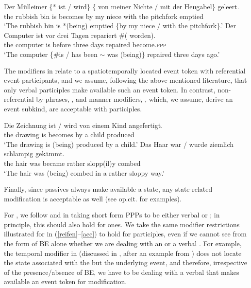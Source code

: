 \documentclass[output=paper,modfonts,newtxmath,hidelinks
\ChapterDOI{10.5281/zenodo.2545513}
]{langscibook}
\begin{document}
\ea\label{reifen}
\ea\gll	Der M\"{u}lleimer \{*\hspace{-2pt} ist / wird\} \{\hspace{-2pt} von meiner Nichte / mit der Heugabel\} geleert.\\
	the {rubbish bin} {} is {} becomes {} by my niece {} with the pitchfork emptied\\
\glt	`The rubbish bin is *(being) emptied \{by my niece / with the pitchfork\}.'
\ex\gll	Der Computer ist vor drei Tagen repariert \#(\hspace{-2pt} worden).\\
	the computer is before three days repaired {} become.\textsc{ppp} \\
\glt	`The computer \{\#is / has been $\sim$ was (being)\} repaired three days ago.'
\z\z

\noindent The modifiers in  relate to a spatiotemporally located event token with referential event participants, and we assume, following the above-mentioned literature, that only verbal participles make available such an event token. In contrast, non-referential by-phrases, , and manner modifiers, , which, we assume,  derive an event subkind, are acceptable with  participles. 

\ea\label{acc}
\ea\gll	Die Zeichnung ist / wird von einem Kind angefertigt.\label{zeichnung}\\
	the drawing is {} becomes by a child produced \\
\glt	`The drawing is (being) produced by a child.'
\ex\gll	Das Haar war / wurde ziemlich schlampig gek\"{a}mmt.\label{schlampig}\\
	the hair was {} became rather slopp(il)y combed\\
\glt	`The hair was (being) combed in a rather sloppy way.'
\z\z

\noindent Finally, since  passives always make available a state, any state-related modification is acceptable as well (see op.cit. for examples).

For , we follow \citet{schoorlemmer95} and \citet{borik13, borik14} in  taking short form  PPPs to be either verbal or ; in principle, this should also hold for  ones. We take the same modifier restrictions illustrated for  in (\ref{reifen}--\ref{acc}) to hold for   participles, even if we cannot see from the form of BE alone whether we are dealing with an  or a verbal . For example, the temporal modifier in  (discussed in \citealt{borik14}, after an example from \citealt{paslawskastechow}) does not locate the state associated with the  but the underlying event, and therefore, irrespective of the presence/absence of BE, we have to be dealing with a verbal  that makes available an event token for modification.
\end{document}
